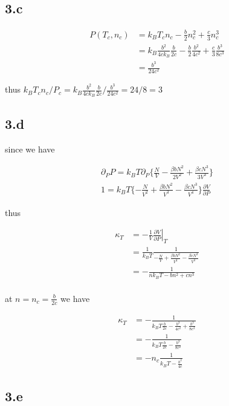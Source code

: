 \documentclass{article}
\begin{document}
\subsection*{3.c}

$$
\begin{aligned}
    P(T_c, n_c) &= k_B T_c n_c - \frac{b}{2}n_c^2 + \frac{c}{3}n_c^3\\
    &= k_B \frac{b^2}{4c k_B} \frac{b}{2c} - \frac{b}{2} \frac{b^2}{4c^2} + \frac{c}{3} \frac{b^3}{8c^3}\\
    &= \frac{b^3}{24c^2}
\end{aligned}
$$

thus $k_B T_c n_c / P_c = k_B \frac{b^2}{4c k_B} \frac{b}{2c} / \frac{b^3}{24c^2} = 24/8 = 3$

\subsection*{3.d}


since we have

$$
\begin{aligned}
    \partial_P P = k_B T \partial_P\{\frac{N}{V} - \frac{\beta b N^2}{2V^2} + \frac{\beta c N^3}{3V^3}\}\\
    1 = k_B T \{-\frac{N}{V^2} + \frac{\beta b N^2}{V^3} -\frac{\beta c N^3}{V^4} \} \frac{\partial V}{\partial P}
\end{aligned}
$$

thus

$$
\begin{aligned}
    \kappa_T &= -\left.\frac{1}{V}\frac{\partial V}{\partial P}\right|_T\\
    &=\frac{1}{k_B T} \frac{1}{-\frac{N}{V} + \frac{\beta b N^2}{V^2} -\frac{\beta c N^3}{V^3}}\\
    &=- \frac{1}{nk_B T - b n^2 +c n^3}\\
\end{aligned}
$$

at $n = n_c = \frac{b}{2c}$ we have

$$
\begin{aligned}
    \kappa_T &= -\frac{1}{k_B T\frac{b}{2c} - \frac{b^3}{4c^2} + \frac{b^3}{8c^2}}\\
    &= -\frac{1}{k_B T\frac{b}{2c} - \frac{b^3}{8c^2}}\\
    &= -n_c\frac{1}{k_B T - \frac{b^2}{4c}}
\end{aligned}
$$

\subsection*{3.e}
\end{document}

